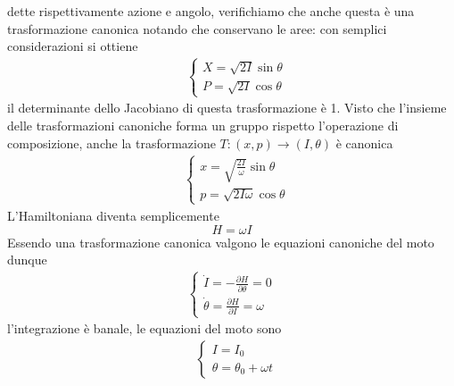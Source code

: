 \documentclass[
10pt, %
a4paper, %
oneside, %
headinclude,footinclude, %
BCOR5mm, %
]{scrartcl}
\begin{document}
dette rispettivamente azione e angolo, verifichiamo che anche questa è una trasformazione canonica notando che conservano le aree:
con semplici considerazioni si ottiene
\begin{align*}
	&\begin{cases}
		X = \sqrt{2I}\sin\theta\\
		P = \sqrt{2I}\cos\theta
	\end{cases}
\end{align*}
il determinante dello Jacobiano di questa trasformazione è 1. Visto che l'insieme delle trasformazioni canoniche forma un gruppo rispetto l'operazione di composizione, anche la trasformazione \(T:(x, p)\rightarrow (I, \theta)\) è canonica
\begin{align*}
	&\begin{cases}
		x = \sqrt{\frac{2I}{\omega}}\sin\theta\\
		p = \sqrt{2I\omega}\cos\theta
	\end{cases}
\end{align*}
L'Hamiltoniana diventa semplicemente
\[H = \omega I \]
Essendo una trasformazione canonica valgono le equazioni canoniche del moto dunque
\begin{align*}
	\begin{cases}
		\dot{I} = -\frac{\partial H}{\partial \theta} = 0\\
		\dot{\theta} = \frac{\partial H}{\partial I} = \omega
	\end{cases}
\end{align*}
l'integrazione è banale, le equazioni del moto sono
\begin{align*}
	&\begin{cases}
		I = I_0\\
		\theta = \theta_0+\omega t
	\end{cases}
\end{align*}
\end{document}

